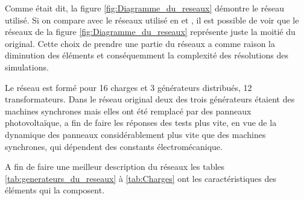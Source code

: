 \newcommand{\trafoi}{40 MVA132/20}
\newcommand{\trafoii}{0.25MVA 20kV/0.4}
\newcommand{\trafoiii}{0.4MVA 20kV/0.4}
\newcommand{\trafoiv}{0.63MVA 20kV/0.4}
\newcommand{\cablei}{ARG7H1RX 185mmq}
\newcommand{\cableii}{ARG7H1RX 70mmq}
\newcommand{\cableiii}{Aerea Cu 70mmq}
Comme était dit, la figure \ref{fig:Diagramme_du_reseaux} démontre le réseau utilisé. Si on compare avec le réseaux utilisé en \cite{cosson:tel-01374469} et \cite{mariani2013controllo}, il est possible de voir que le réseaux de la figure  \ref{fig:Diagramme_du_reseaux} représente juste la moitié du original. Cette choix de prendre une partie du réseaux a comme raison la diminution des éléments et conséquemment la complexité des résolutions des simulations.

Le réseau est formé pour 16 charges et 3 générateurs distribués, 12 transformateurs.
Dans le réseau original deux des trois générateurs étaient des machines synchrones mais elles ont été remplacé par des panneaux photovoltaïque, a fin de faire les réponses des tests plus vite, en vue de la dynamique des panneaux considérablement plus vite que des machines synchrones, qui dépendent des constants électromécanique. 

A fin de faire une meilleur description du réseaux les tables \ref{tab:generateurs_du_reseaux} à \ref{tab:Charges} ont les caractéristiques des éléments qui la composent.

